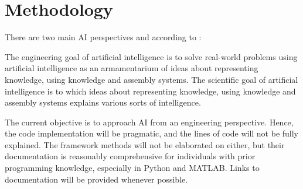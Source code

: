 \chapter{Methodology}\label{sec:methodology}

There are two main AI perspectives and according to \textcite{winston1992}:
%
\begin{citacao}[english]
    The engineering goal of artificial intelligence is to solve real-world problems using artificial intelligence as an armamentarium of ideas about representing knowledge, using knowledge and assembly systems. The scientific goal of artificial intelligence is to which ideas about representing knowledge, using knowledge and assembly systems explains various sorts of intelligence.
\end{citacao}
The current objective is to approach AI from an engineering perspective. 
Hence, the code implementation will be pragmatic, and the lines of code will not be fully explained. 
The framework methods will not be elaborated on either, but their documentation is reasonably comprehensive for individuals with prior programming knowledge, especially in Python and MATLAB. 
Links to documentation will be provided whenever possible.

